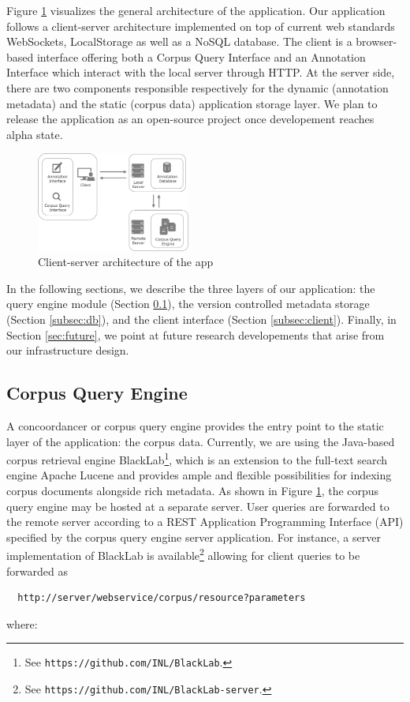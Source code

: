 \documentclass{sig-alternate}
\begin{document}
Figure \ref{fig:app} visualizes the general architecture of the application.
Our application follows a client-server architecture implemented on top of current web standards
\textemdash WebSockets, LocalStorage \textemdash as well as a NoSQL database.
The client is a browser-based interface offering both a Corpus Query Interface and an Annotation
Interface which interact with the local server through HTTP.
At the server side, there are two components responsible respectively for the dynamic (annotation
metadata) and the static (corpus data) application storage layer. We plan to release the
application as an open-source project once developement reaches alpha state.

\begin{figure}
  \centering
  \includegraphics[width=0.45\textwidth]{./img/app-remote.pdf}
  \caption{\label{fig:app}Client-server architecture of the app}
\end{figure}

In the following sections, we describe the three layers of our application: the query engine module
(Section \ref{subsec:conc}), the version controlled metadata storage (Section \ref{subsec:db}),
and the client interface (Section \ref{subsec:client}). Finally, in Section \ref{sec:future},
we point at future research developements that arise from our infrastructure design.

\subsection{Corpus Query Engine}\label{subsec:conc}
A concoordancer or corpus query engine provides the entry point to the static layer of the
application: the corpus data. Currently, we are using the Java-based corpus retrieval engine
BlackLab\footnote{
  See \texttt{https://github.com/INL/BlackLab}.
}, which is an extension to the full-text search engine Apache Lucene and provides ample and
flexible possibilities for indexing corpus documents alongside rich metadata.
As shown in Figure \ref{fig:app}, the corpus query engine may be hosted at a separate server.
User queries are forwarded to the remote server according to a REST Application Programming
Interface (API) specified by the corpus query engine server application.
For instance, a server implementation of BlackLab is available\footnote{
  See \texttt{https://github.com/INL/BlackLab-server}.
} allowing for client queries to be forwarded as
\begin{verbatim}
  http://server/webservice/corpus/resource?parameters
\end{verbatim}
where:
\end{document}
